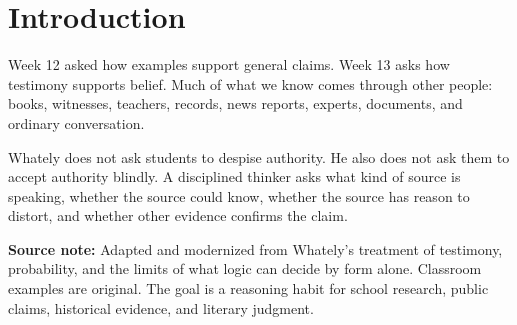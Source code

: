 \documentclass[12pt]{article}
\newcommand{\focusbox}[1]{\par\vspace{0.4em}\noindent\begingroup\setlength{\fboxsep}{6pt}\colorbox{gray!12}{\begin{minipage}{\dimexpr\linewidth-2\fboxsep\relax}#1\end{minipage}}\endgroup\par\vspace{0.5em}}
\begin{document}
\section*{Introduction}
Week 12 asked how examples support general claims. Week 13 asks how testimony supports belief. Much of what we know comes through other people: books, witnesses, teachers, records, news reports, experts, documents, and ordinary conversation.

Whately does not ask students to despise authority. He also does not ask them to accept authority blindly. A disciplined thinker asks what kind of source is speaking, whether the source could know, whether the source has reason to distort, and whether other evidence confirms the claim.

\focusbox{\textbf{Source note:} Adapted and modernized from Whately's treatment of testimony, probability, and the limits of what logic can decide by form alone. Classroom examples are original. The goal is a reasoning habit for school research, public claims, historical evidence, and literary judgment.}
\end{document}
